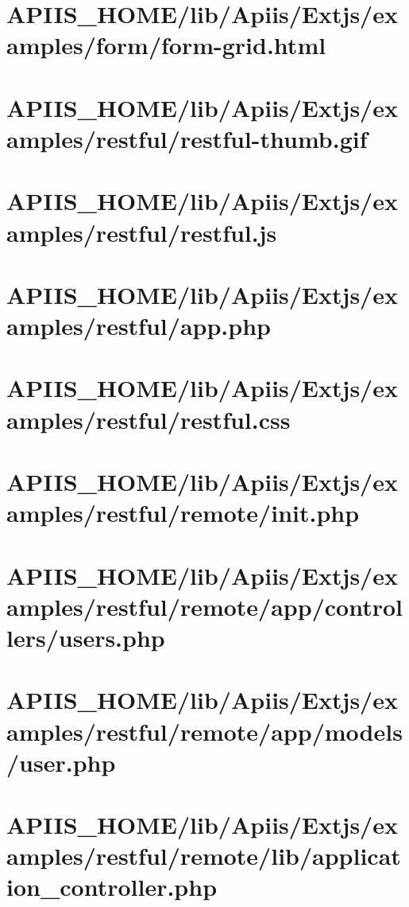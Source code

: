 \section{APIIS\_HOME/lib/Apiis/Extjs/examples/form/form-grid.html} 
\section{APIIS\_HOME/lib/Apiis/Extjs/examples/restful/restful-thumb.gif} 
\section{APIIS\_HOME/lib/Apiis/Extjs/examples/restful/restful.js} 
\section{APIIS\_HOME/lib/Apiis/Extjs/examples/restful/app.php} 
\section{APIIS\_HOME/lib/Apiis/Extjs/examples/restful/restful.css} 
\section{APIIS\_HOME/lib/Apiis/Extjs/examples/restful/remote/init.php} 
\section{APIIS\_HOME/lib/Apiis/Extjs/examples/restful/remote/app/controllers/users.php} 
\section{APIIS\_HOME/lib/Apiis/Extjs/examples/restful/remote/app/models/user.php} 
\section{APIIS\_HOME/lib/Apiis/Extjs/examples/restful/remote/lib/application\_controller.php} 
